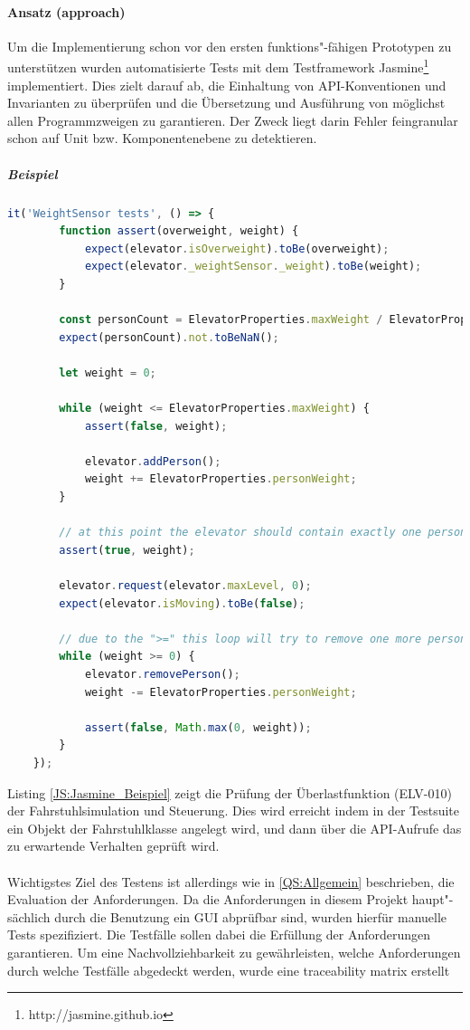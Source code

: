 \paragraph{Ansatz (approach)}
Um die Implementierung schon vor den ersten funktions"-fähigen Prototypen zu unterstützen wurden automatisierte Tests mit dem Testframework Jasmine\footnote{http://jasmine.github.io} implementiert. Dies zielt darauf ab, die Einhaltung von API-Konventionen und Invarianten zu überprüfen und die Übersetzung und Ausführung von möglichst allen Programmzweigen zu garantieren. Der Zweck liegt darin Fehler feingranular schon auf Unit bzw. Komponentenebene zu detektieren.
\subparagraph{Beispiel} \begin{lstlisting}[language=JavaScript,label=JS:Jasmine_Beispiel,caption=Jasmine Test Beispiel]
	it('WeightSensor tests', () => {
		function assert(overweight, weight) {
			expect(elevator.isOverweight).toBe(overweight);
			expect(elevator._weightSensor._weight).toBe(weight);
		}

		const personCount = ElevatorProperties.maxWeight / ElevatorProperties.personWeight;
		expect(personCount).not.toBeNaN();

		let weight = 0;

		while (weight <= ElevatorProperties.maxWeight) {
			assert(false, weight);

			elevator.addPerson();
			weight += ElevatorProperties.personWeight;
		}

		// at this point the elevator should contain exactly one person more than maximally allowed
		assert(true, weight);

		elevator.request(elevator.maxLevel, 0);
		expect(elevator.isMoving).toBe(false);

		// due to the ">=" this loop will try to remove one more person after the elevator is already empty
		while (weight >= 0) {
			elevator.removePerson();
			weight -= ElevatorProperties.personWeight;

			assert(false, Math.max(0, weight));
		}
	});
\end{lstlisting}
Listing \ref{JS:Jasmine_Beispiel} zeigt die Prüfung der Überlastfunktion (ELV-010) der Fahrstuhlsimulation und Steuerung. Dies wird erreicht indem in der Testsuite ein Objekt der Fahrstuhlklasse angelegt wird, und dann über die API-Aufrufe das zu erwartende Verhalten geprüft wird.

\paragraph{}
Wichtigstes Ziel des Testens ist allerdings wie in \ref{QS:Allgemein} beschrieben, die Evaluation der Anforderungen. Da die Anforderungen in diesem Projekt haupt"-sächlich durch die Benutzung ein GUI abprüfbar sind, wurden hierfür manuelle Tests spezifiziert. Die Testfälle sollen dabei die Erfüllung der Anforderungen garantieren\cite[Based on property coverage, Seite 16]{Pernambuco:TestTechniques}. Um eine Nachvollziehbarkeit zu gewährleisten, welche Anforderungen durch welche Testfälle abgedeckt werden, wurde eine traceability matrix erstellt\cite[Seite 101]{Pernambuco:TestTechniques}


